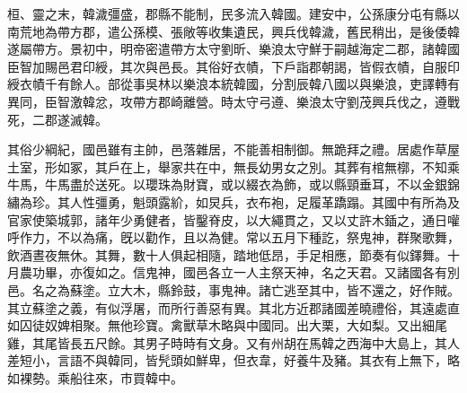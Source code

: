 \begin{pinyinscope}
 
 
 
 桓、靈之末，韓濊彊盛，郡縣不能制，民多流入韓國。建安中，公孫康分屯有縣以南荒地為帶方郡，遣公孫模、張敞等收集遺民，興兵伐韓濊，舊民稍出，是後倭韓遂屬帶方。景初中，明帝密遣帶方太守劉昕、樂浪太守鮮于嗣越海定二郡，諸韓國臣智加賜邑君印綬，其次與邑長。其俗好衣幘，下戶詣郡朝謁，皆假衣幘，自服印綬衣幘千有餘人。部從事吳林以樂浪本統韓國，分割辰韓八國以與樂浪，吏譯轉有異同，臣智激韓忿，攻帶方郡崎離營。時太守弓遵、樂浪太守劉茂興兵伐之，遵戰死，二郡遂滅韓。
 
 
 
 
 其俗少綱紀，國邑雖有主帥，邑落雜居，不能善相制御。無跪拜之禮。居處作草屋土室，形如冢，其戶在上，舉家共在中，無長幼男女之別。其葬有棺無槨，不知乘牛馬，牛馬盡於送死。以瓔珠為財寶，或以綴衣為飾，或以縣頸垂耳，不以金銀錦繡為珍。其人性彊勇，魁頭露紒，如炅兵，衣布袍，足履革蹻蹋。其國中有所為及官家使築城郭，諸年少勇健者，皆鑿脊皮，以大繩貫之，又以丈許木鍤之，通日嚾呼作力，不以為痛，旣以勸作，且以為健。常以五月下種訖，祭鬼神，群聚歌舞，飲酒晝夜無休。其舞，數十人俱起相隨，踏地低昂，手足相應，節奏有似鐸舞。十月農功畢，亦復如之。信鬼神，國邑各立一人主祭天神，名之天君。又諸國各有別邑。名之為蘇塗。立大木，縣鈴鼓，事鬼神。諸亡逃至其中，皆不還之，好作賊。其立蘇塗之義，有似浮屠，而所行善惡有異。其北方近郡諸國差曉禮俗，其遠處直如囚徒奴婢相聚。無他珍寶。禽獸草木略與中國同。出大栗，大如梨。又出細尾雞，其尾皆長五尺餘。其男子時時有文身。又有州胡在馬韓之西海中大島上，其人差短小，言語不與韓同，皆髠頭如鮮卑，但衣韋，好養牛及豬。其衣有上無下，略如裸勢。乘船往來，巿買韓中。
 
 
\end{pinyinscope}